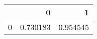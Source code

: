 \begin{tabular}{lrr}
\toprule
{} &         0 &         1 \\
\midrule
0 &  0.730183 &  0.954545 \\
\bottomrule
\end{tabular}
